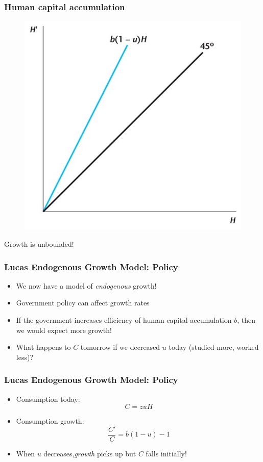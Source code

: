 \documentclass{beamer}
\begin{document}
\begin{frame}
\frametitle[alignment=center]{Human capital accumulation }
\begin{figure}
\centering
\includegraphics[scale=0.5]{Figures/W_Fig_8pt6.png}
\end{figure}
Growth is unbounded!
\end{frame}



\begin{frame}
\frametitle[alignment=center]{Lucas Endogenous Growth Model: Policy}
\begin{itemize}
\item We now have a model of \emph{endogenous} growth!
\bigskip
\item Government policy can affect growth rates
\bigskip
\item If the government increases efficiency of human capital accumulation $b$, then we would expect more growth!
\bigskip
\item What happens to $C$ tomorrow if we decreased $u$ today (studied more, worked less)?
\end{itemize}
\end{frame}

\begin{frame}
\frametitle[alignment=center]{Lucas Endogenous Growth Model: Policy}
\begin{itemize}
\item Consumption today:  
$$C=zuH$$
\item Consumption growth:
$$\frac{C'}{C}=b(1-u)-1$$
\item When $u$ decreases,\emph{growth} picks up but $C$ falls initially!
\end{itemize}
\end{frame}
\end{document}
